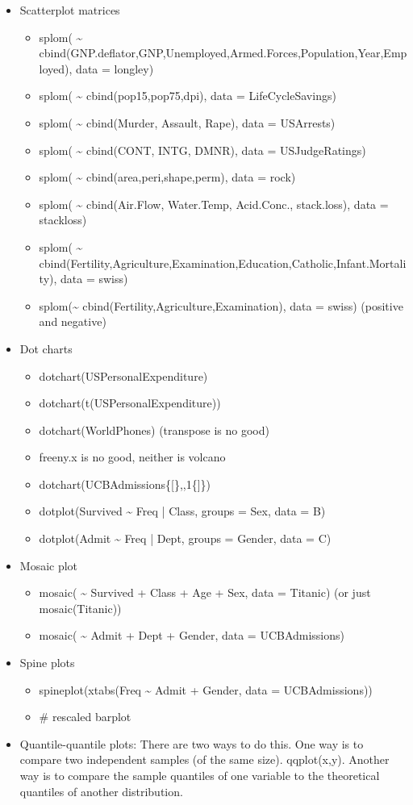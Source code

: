 \documentclass[captions=tableheading]{scrbook}
\begin{document}
\begin{itemize}
\item Scatterplot matrices
\begin{itemize}
\item splom( \~{} cbind(GNP.deflator,GNP,Unemployed,Armed.Forces,Population,Year,Employed),  data = longley)
\item splom( \~{} cbind(pop15,pop75,dpi), data = LifeCycleSavings)
\item splom( \~{} cbind(Murder, Assault, Rape), data = USArrests)
\item splom( \~{} cbind(CONT, INTG, DMNR), data = USJudgeRatings)
\item splom( \~{} cbind(area,peri,shape,perm), data = rock)
\item splom( \~{} cbind(Air.Flow, Water.Temp, Acid.Conc., stack.loss), data = stackloss)
\item splom( \~{} cbind(Fertility,Agriculture,Examination,Education,Catholic,Infant.Mortality), data = swiss)
\item splom(\~{} cbind(Fertility,Agriculture,Examination), data = swiss) (positive and negative)
\end{itemize}
\item Dot charts
\begin{itemize}
\item dotchart(USPersonalExpenditure)
\item dotchart(t(USPersonalExpenditure))
\item dotchart(WorldPhones) (transpose is no good)
\item freeny.x is no good, neither is volcano
\item dotchart(UCBAdmissions\{[\},,1\{]\})
\item dotplot(Survived \~{} Freq | Class, groups = Sex, data = B)
\item dotplot(Admit \~{} Freq | Dept, groups = Gender, data = C)
\end{itemize}
\item Mosaic plot
\begin{itemize}
\item mosaic( \~{} Survived + Class + Age + Sex, data = Titanic) (or just mosaic(Titanic))
\item mosaic( \~{} Admit + Dept + Gender, data = UCBAdmissions)
\end{itemize}
\item Spine plots
\begin{itemize}
\item spineplot(xtabs(Freq \~{} Admit + Gender, data = UCBAdmissions))
\item \# rescaled barplot
\end{itemize}
\item Quantile-quantile plots: There are two ways to do this. One way is to compare two independent samples (of the same size). qqplot(x,y). Another way is to compare the sample quantiles of one variable to the theoretical quantiles of another distribution.
\end{itemize}
\end{document}
